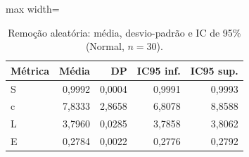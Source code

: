 \begin{table}[!htb]
\centering
\caption{Remoção aleatória: média, desvio-padrão e IC de 95\% (Normal, $n = 30$).}
\label{tab:robustezic}
\begin{adjustbox}{max width=\linewidth}
\begin{tabular}{lrrrr}
\toprule
Métrica & Média & DP & IC95 inf. & IC95 sup. \\
\midrule
S & 0,9992 & 0,0004 & 0,9991 & 0,9993 \\
c & 7,8333 & 2,8658 & 6,8078 & 8,8588 \\
L & 3,7960 & 0,0285 & 3,7858 & 3,8062 \\
E & 0,2784 & 0,0022 & 0,2776 & 0,2792 \\
\bottomrule
\end{tabular}
\end{adjustbox}
\end{table}
